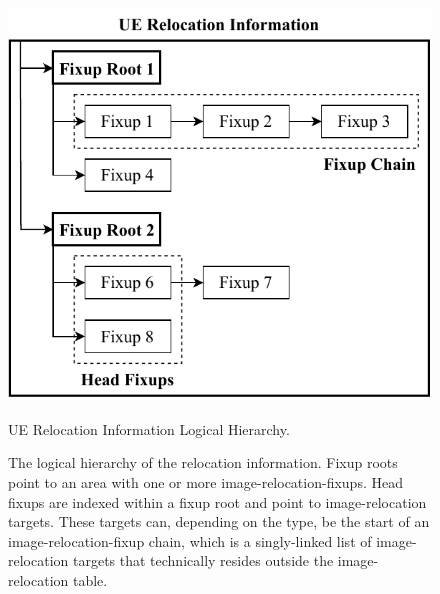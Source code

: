 \begin{figure}[htb]
  \centering
  \includegraphics{Figures/UeRelocHierarchy.pdf}
  \caption{UE Relocation Information Logical Hierarchy.}
  \label{fig:ue_reloc_hierarchy}
  \caption*{The logical hierarchy of the  relocation information. Fixup roots point to an area with one or more \glspl{image-relocation-fixup}. Head fixups are indexed within a fixup root and point to \gls{image-relocation} targets. These targets can, depending on the type, be the start of an \gls{image-relocation-fixup} chain, which is a singly-linked list of \gls{image-relocation} targets that technically resides outside the \gls{image-relocation} table.}
\end{figure}

